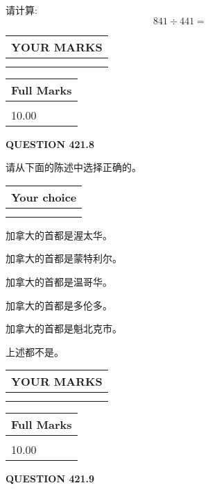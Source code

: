 \documentclass{ctexart}
\begin{document}
  
 
请计算:
\begin{equation}
841  \div    %
441 = \nonumber
\end{equation}
 

 

 
  
\vspace{0.2in}
  
\noindent\begin{tabular}{|l|}
\hline
 YOUR MARKS  \\
\hline
 \\ 
 \\ 
\hline
\end{tabular}
\hspace{0.05in} \begin{tabular}{|l|}
\hline
 Full Marks  \\
\hline
 \\ 
10.00 \\
\hline
\end{tabular}
{\textbf{\Large{QUESTION
421.8 
}}}
  
  
请从下面的陈述中选择正确的。
  
  
\noindent\hspace{3.0in} \begin{tabular}{|l|}
\hline
Your choice \\
\hline
 \\ 
 \\ 
\hline
\end{tabular}
  
  
 
 
加拿大的首都是渥太华。
 
 
加拿大的首都是蒙特利尔。
 
 
加拿大的首都是温哥华。
 
 
加拿大的首都是多伦多。
 
 
加拿大的首都是魁北克市。
 
 
 上述都不是。
 
 
  
\vspace{0.2in}
  
\noindent\begin{tabular}{|l|}
\hline
 YOUR MARKS  \\
\hline
 \\ 
 \\ 
\hline
\end{tabular}
\hspace{0.05in} \begin{tabular}{|l|}
\hline
 Full Marks  \\
\hline
 \\ 
10.00 \\
\hline
\end{tabular}
{\textbf{\Large{QUESTION
421.9 
}}}
  
\end{document}
